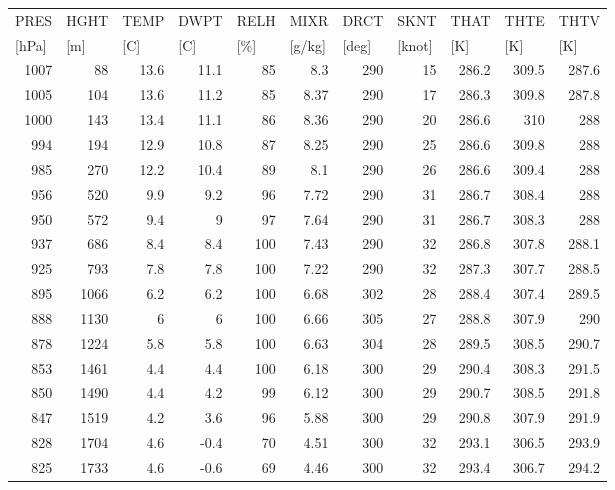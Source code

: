 \documentclass{article}
\begin{document}
\begin{longtable}{r|r|r|r|r|r|r|r|r|r|r}
\multicolumn{1}{l}{PRES } & \multicolumn{1}{l}{HGHT } & \multicolumn{1}{l}{TEMP } & \multicolumn{1}{l}{DWPT } & \multicolumn{1}{l}{RELH} & \multicolumn{1}{l}{MIXR } & \multicolumn{1}{l}{DRCT } & \multicolumn{1}{l}{SKNT } & \multicolumn{1}{l}{THAT} & \multicolumn{1}{l}{ THTE} & \multicolumn{1}{l}{THTV} \\
\multicolumn{1}{l}{[hPa]} & \multicolumn{1}{l}{[m]} & \multicolumn{1}{l}{[C]} & \multicolumn{1}{l}{[C] } & \multicolumn{1}{l}{[\%]} & \multicolumn{1}{l}{[g/kg]} & \multicolumn{1}{l}{[deg]} & \multicolumn{1}{l}{[knot]} & \multicolumn{1}{l}{[K]} & \multicolumn{1}{l}{[K]} & \multicolumn{1}{l}{[K]} \\ \hline
1007 & 88 & 13.6 & 11.1 & 85 & 8.3 & 290 & 15 & 286.2 & 309.5 & 287.6 \\
1005 & 104 & 13.6 & 11.2 & 85 & 8.37 & 290 & 17 & 286.3 & 309.8 & 287.8 \\
1000 & 143 & 13.4 & 11.1 & 86 & 8.36 & 290 & 20 & 286.6 & 310 & 288 \\
994 & 194 & 12.9 & 10.8 & 87 & 8.25 & 290 & 25 & 286.6 & 309.8 & 288 \\
985 & 270 & 12.2 & 10.4 & 89 & 8.1 & 290 & 26 & 286.6 & 309.4 & 288 \\
956 & 520 & 9.9 & 9.2 & 96 & 7.72 & 290 & 31 & 286.7 & 308.4 & 288 \\
950 & 572 & 9.4 & 9 & 97 & 7.64 & 290 & 31 & 286.7 & 308.3 & 288 \\
937 & 686 & 8.4 & 8.4 & 100 & 7.43 & 290 & 32 & 286.8 & 307.8 & 288.1 \\
925 & 793 & 7.8 & 7.8 & 100 & 7.22 & 290 & 32 & 287.3 & 307.7 & 288.5 \\
895 & 1066 & 6.2 & 6.2 & 100 & 6.68 & 302 & 28 & 288.4 & 307.4 & 289.5 \\
888 & 1130 & 6 & 6 & 100 & 6.66 & 305 & 27 & 288.8 & 307.9 & 290 \\
878 & 1224 & 5.8 & 5.8 & 100 & 6.63 & 304 & 28 & 289.5 & 308.5 & 290.7 \\
853 & 1461 & 4.4 & 4.4 & 100 & 6.18 & 300 & 29 & 290.4 & 308.3 & 291.5 \\
850 & 1490 & 4.4 & 4.2 & 99 & 6.12 & 300 & 29 & 290.7 & 308.5 & 291.8 \\
847 & 1519 & 4.2 & 3.6 & 96 & 5.88 & 300 & 29 & 290.8 & 307.9 & 291.9 \\
828 & 1704 & 4.6 & -0.4 & 70 & 4.51 & 300 & 32 & 293.1 & 306.5 & 293.9 \\
825 & 1733 & 4.6 & -0.6 & 69 & 4.46 & 300 & 32 & 293.4 & 306.7 & 294.2 \\

\end{longtable}
\end{document}
